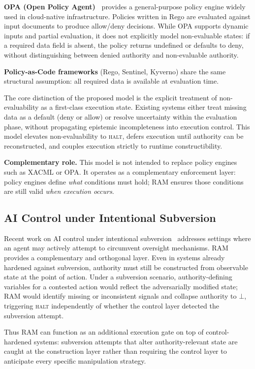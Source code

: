 \documentclass[11pt]{article}
\begin{document}
\textbf{OPA (Open Policy Agent)~\cite{opa2016}} provides a general-purpose policy
engine widely used in cloud-native infrastructure. Policies written in Rego are
evaluated against input documents to produce allow/deny decisions. While OPA supports
dynamic inputs and partial evaluation, it does not explicitly model non-evaluable states:
if a required data field is absent, the policy returns undefined or defaults to deny,
without distinguishing between denied authority and non-evaluable authority.

\textbf{Policy-as-Code frameworks} (Rego, Sentinel, Kyverno) share the same structural
assumption: all required data is available at evaluation time.

The core distinction of the proposed model is the explicit treatment of
non-evaluability as a first-class execution state. Existing systems either treat missing
data as a default (deny or allow) or resolve uncertainty within the evaluation phase,
without propagating epistemic incompleteness into execution control. This model elevates
non-evaluability to \textsc{halt}, defers execution until authority can be reconstructed,
and couples execution strictly to runtime constructibility.

\textbf{Complementary role.} This model is not intended to replace policy engines such
as XACML or OPA. It operates as a complementary enforcement layer: policy engines define
\textit{what} conditions must hold; RAM ensures those conditions are still valid
\textit{when execution occurs}.

\subsection{AI Control under Intentional Subversion}

Recent work on AI control under intentional subversion~\cite{greenblatt2024ai} addresses
settings where an agent may actively attempt to circumvent oversight mechanisms. RAM
provides a complementary and orthogonal layer. Even in systems already hardened against
subversion, authority must still be constructed from observable state at the point of
action. Under a subversion scenario, authority-defining variables for a contested action
would reflect the adversarially modified state; RAM would identify missing or inconsistent
signals and collapse authority to $\bot$, triggering \textsc{halt} independently of
whether the control layer detected the subversion attempt.

Thus RAM can function as an additional execution gate on top of control-hardened systems:
subversion attempts that alter authority-relevant state are caught at the construction
layer rather than requiring the control layer to anticipate every specific manipulation
strategy.
\end{document}
